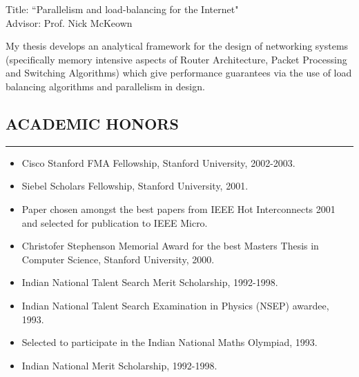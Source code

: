 \documentclass[10pt,a4]{article}
\begin{document}
\begin{small}
\begin{list}{}{}
\item Title: ``Parallelism and load-balancing for the Internet"  \\
Advisor: Prof. Nick McKeown
\end{list}

My thesis develops an analytical framework for the design of networking systems
(specifically memory intensive aspects of Router Architecture, Packet Processing and Switching Algorithms) which give performance guarantees via the use of load balancing algorithms and parallelism in design. 

\subsection*{ACADEMIC HONORS}
\hrule
\vspace{0.2cm}
\begin{itemize}

	\item Cisco Stanford FMA Fellowship, Stanford University, 2002-2003.

	\item Siebel Scholars Fellowship, Stanford University, 2001.

        \item  Paper chosen amongst the best papers from IEEE Hot Interconnects 2001 and
selected for publication to IEEE Micro.

	\item Christofer Stephenson Memorial Award for the 
    best Masters Thesis in Computer Science, Stanford University, 2000.

	\item Indian National Talent Search Merit Scholarship, 1992-1998.

	\item Indian National Talent Search Examination in Physics (NSEP) awardee, 1993.

	\item  Selected to participate in the Indian National Maths Olympiad, 1993.

    \item Indian National Merit Scholarship, 1992-1998.

\end{itemize}

\newpage
\pagestyle{fancy}
\lhead{\textcolor{gray}{\it Sundar Iyer}}
\fancyfoot[C]{}


\end{small}
\end{document}
